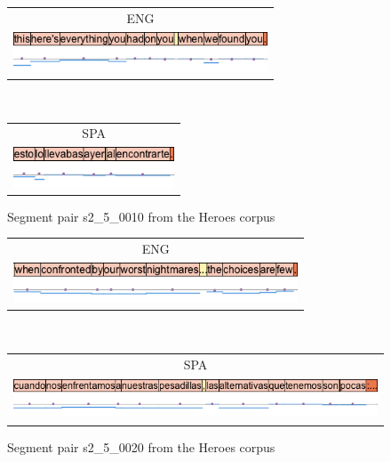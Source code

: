 \begin{figure}[h!]
\centering
\begin{minipage}[t]{0.61\textwidth}
\begin{tabular}{c}
ENG \\
\includegraphics[height=1.2cm]{img/s2_5_0010-EN.png} \\
\end{tabular}
\end{minipage}
\\
\begin{minipage}[t]{0.4\textwidth}
\begin{tabular}{c}
SPA \\
\includegraphics[height=1.2cm]{img/s2_5_0010-ES.png} \\
\end{tabular}
\end{minipage}
\caption{Segment pair s2\_5\_0010 from the Heroes corpus}
\label{figure:heroes_viz_2}
\end{figure}

\begin{figure}[h!]
\centering
\begin{minipage}[t]{0.63\textwidth}
\begin{tabular}{c}
ENG \\
\includegraphics[height=1.2cm]{img/s2_5_0020-EN.png} \\
\end{tabular}
\end{minipage}
\\
\begin{minipage}[t]{0.85\textwidth}
\begin{tabular}{c}
SPA \\
\includegraphics[height=1.2cm]{img/s2_5_0020-ES.png} \\
\end{tabular}
\end{minipage}
\caption{Segment pair s2\_5\_0020 from the Heroes corpus}
\label{figure:heroes_viz_3}
\end{figure}

